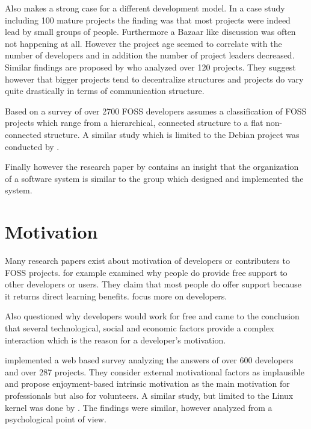 Also \textcite{Krishnamurthy2002} makes a strong case for a different
development model. In a case study including 100 mature projects the finding
was that most projects were indeed lead by small groups of people. Furthermore
a Bazaar like discussion was often not happening at all. However the project
age seemed to correlate with the number of developers and in addition the
number of project leaders decreased. Similar findings are proposed by
\textcite{Crowston2005a} who analyzed over 120 projects. They suggest however
that bigger projects tend to decentralize structures and projects do vary quite
drastically in terms of communication structure.

Based on a survey of over 2700 \ac{FOSS} developers \textcite{Ghosh2005}
assumes a classification of \ac{FOSS} projects which range from a hierarchical,
connected structure to a flat non-connected structure. A similar study which is
limited to the Debian project was conducted by \textcite{Sadowski2008}.

Finally however the research paper by \textcite{Conway1968} contains an insight
that the organization of a software system is similar to the group which
designed and implemented the system.


\section{Motivation} %

Many research papers exist about motivation of developers or contributers to
\ac{FOSS} projects. \textcite{Lakhani2002} for example examined why people do
provide free support to other developers or users. They claim that most people
do offer support because it returns direct learning benefits.
\textcite{Lerner2000} focus more on developers.

Also \textcite{Grazzini2009} questioned why developers would work for free and
came to the conclusion that several technological, social and economic factors
provide a complex interaction which is the reason for a developer's motivation.

\textcite{Lakhani2003} implemented a web based survey analyzing the answers of
over 600 developers and over 287 projects. They consider external motivational
factors as implausible and propose enjoyment-based intrinsic motivation as the
main motivation for professionals but also for volunteers. A similar study, but
limited to the Linux kernel was done by \textcite{Hertel2003}. The findings
were similar, however analyzed from a psychological point of view.

